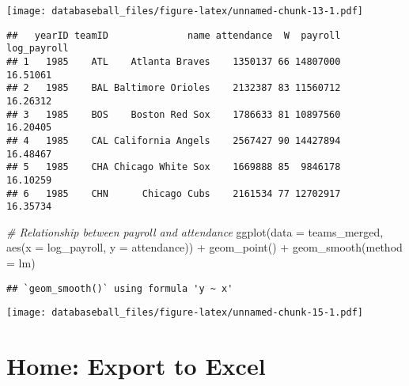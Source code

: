 \documentclass[
]{article}
\newenvironment{Shaded}{\begin{snugshade}}{\end{snugshade}}
\newcommand{\AttributeTok}[1]{\textcolor[rgb]{0.77,0.63,0.00}{#1}}
\newcommand{\CommentTok}[1]{\textcolor[rgb]{0.56,0.35,0.01}{\textit{#1}}}
\newcommand{\FunctionTok}[1]{\textcolor[rgb]{0.00,0.00,0.00}{#1}}
\newcommand{\NormalTok}[1]{#1}
\newcommand{\OtherTok}[1]{\textcolor[rgb]{0.56,0.35,0.01}{#1}}
\newcommand{\SpecialCharTok}[1]{\textcolor[rgb]{0.00,0.00,0.00}{#1}}
\newcommand{\StringTok}[1]{\textcolor[rgb]{0.31,0.60,0.02}{#1}}
\begin{document}
\texttt{[image: databaseball\_files/figure-latex/unnamed-chunk-13-1.pdf]}

\begin{Shaded}
\end{Shaded}

\begin{verbatim}
##   yearID teamID              name attendance  W  payroll log_payroll
## 1   1985    ATL    Atlanta Braves    1350137 66 14807000    16.51061
## 2   1985    BAL Baltimore Orioles    2132387 83 11560712    16.26312
## 3   1985    BOS    Boston Red Sox    1786633 81 10897560    16.20405
## 4   1985    CAL California Angels    2567427 90 14427894    16.48467
## 5   1985    CHA Chicago White Sox    1669888 85  9846178    16.10259
## 6   1985    CHN      Chicago Cubs    2161534 77 12702917    16.35734
\end{verbatim}

\begin{Shaded}
\begin{Highlighting}[]
\CommentTok{\# Relationship between payroll and attendance}
\FunctionTok{ggplot}\NormalTok{(}\AttributeTok{data =}\NormalTok{ teams\_merged, }\FunctionTok{aes}\NormalTok{(}\AttributeTok{x =}\NormalTok{ log\_payroll, }\AttributeTok{y =}\NormalTok{ attendance)) }\SpecialCharTok{+}
  \FunctionTok{geom\_point}\NormalTok{() }\SpecialCharTok{+}
  \FunctionTok{geom\_smooth}\NormalTok{(}\AttributeTok{method =} \StringTok{\textquotesingle{}lm\textquotesingle{}}\NormalTok{)}
\end{Highlighting}
\end{Shaded}

\begin{verbatim}
## `geom_smooth()` using formula 'y ~ x'
\end{verbatim}

\texttt{[image: databaseball\_files/figure-latex/unnamed-chunk-15-1.pdf]}

\hypertarget{home-export-to-excel}{%
\section{Home: Export to Excel}\label{home-export-to-excel}}
\end{document}
